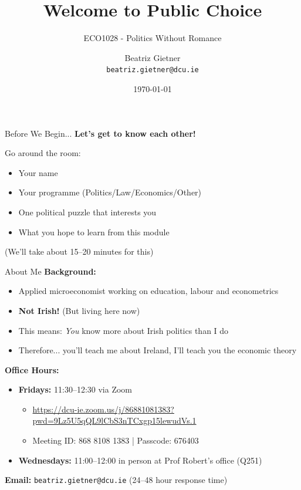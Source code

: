 \documentclass[10pt]{beamer}
\title{Welcome to Public Choice}
\subtitle{ECO1028 - Politics Without Romance}
\author{Beatriz Gietner\\
\texttt{beatriz.gietner@dcu.ie}}
\date{\today}
\begin{document}
\maketitle

\begin{frame}{Before We Begin...}
\textbf{Let's get to know each other!}

\vspace{0.5cm}
Go around the room:
\begin{itemize}
\item Your name
\item Your programme (Politics/Law/Economics/Other)
\item One political puzzle that interests you
\item What you hope to learn from this module
\end{itemize}

\vspace{0.5cm}
\small{(We'll take about 15--20 minutes for this)}
\end{frame}

\begin{frame}{About Me}
\textbf{Background:}
\begin{itemize}
\item Applied microeconomist working on education, labour and econometrics
\item \textbf{Not Irish!} (But living here now)
\item This means: \textit{You} know more about Irish politics than I do
\item Therefore... you'll teach me about Ireland, I'll teach you the economic theory
\end{itemize}

\vspace{0.3cm}

\textbf{Office Hours:}
\begin{itemize}
\item \textbf{Fridays:} 11:30--12:30 via Zoom
\begin{itemize}
\item[\textbullet] \small{\url{https://dcu-ie.zoom.us/j/86881081383?pwd=9Lz5U5qQL9lCbS3nTCxgp15lewudVs.1}}
\item[\textbullet] \small{Meeting ID: 868 8108 1383 | Passcode: 676403}
\end{itemize}
\item \textbf{Wednesdays:} 11:00--12:00 in person at Prof Robert's office (Q251)
\end{itemize}

\vspace{0.2cm}

\textbf{Email:} \texttt{beatriz.gietner@dcu.ie} (24--48 hour response time)
\end{frame}
\end{document}
